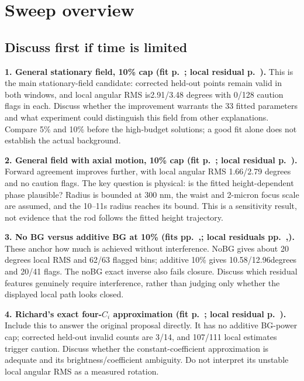 \documentclass[10pt,a4paper]{article}
\begin{document}
\newpage
\section{Sweep overview}
\subsection*{Discuss first if time is limited}
\textbf{1. General stationary field, 10\% cap (fit p.~\pageref{case:general:10pct}; local residual p.~\pageref{local:general}).} This is the main stationary-field candidate: corrected held-out points remain valid in both windows, and local angular RMS is2.91/3.48 degrees with 0/128 caution flags in each. Discuss whether the improvement warrants the 33 fitted parameters and what experiment could distinguish this field from other explanations. Compare 5\% and 10\% before the high-budget solutions; a good fit alone does not establish the actual background.

\textbf{2. General field with axial motion, 10\% cap (fit p.~\pageref{case:axial:10pct}; local residual p.~\pageref{local:axial}).} Forward agreement improves further, with local angular RMS 1.66/2.79 degrees and no caution flags. The key question is physical: is the fitted height-dependent phase plausible? Radius is bounded at 300 nm, the waist and 2-micron focus scale are assumed, and the 10--11s radius reaches its bound. This is a sensitivity result, not evidence that the rod follows the fitted height trajectory.

\textbf{3. No BG versus additive BG at 10\% (fits pp.~\pageref{case:none:uncapped},\pageref{case:square:10pct}; local residuals pp.~\pageref{local:none},\pageref{local:square}).} These anchor how much is achieved without interference. NoBG gives about 20 degrees local RMS and 62/63 flagged bins; additive 10\% gives 10.58/12.96degrees and 20/41 flags. The noBG exact inverse also fails closure. Discuss which residual features genuinely require interference, rather than judging only whether the displayed local path looks closed.

\textbf{4. Richard's exact four-$C_i$ approximation (fit p.~\pageref{case:richard_product:uncapped}; local residual p.~\pageref{local:richard_product}).} Include this to answer the original proposal directly. It has no additive BG-power cap; corrected held-out invalid counts are 3/14, and 107/111 local estimates trigger caution. Discuss whether the constant-coefficient approximation is adequate and its brightness/coefficient ambiguity. Do not interpret its unstable local angular RMS as a measured rotation.
\end{document}
